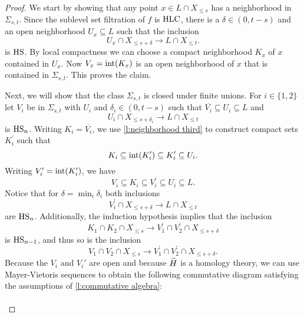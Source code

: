 \begin{proof}
	We start by showing that any point $x \in L \cap X_{\leq s}$ has a neighborhood in $\Sigma_{s, t}$.
	Since the sublevel set filtration of $f$ is $\mathrm{HLC}$, there is a $\delta \in (0, t-s)$ and an open neighborhood $U_x \subseteq L$ such that the inclusion
	\begin{equation*}
	U_x \cap X_{\leq s + \delta} \to
	L \cap X_{\leq t}.
	\end{equation*}
	is $\mathrm{HS}$.
	By local compactness we can choose a compact neighborhood $K_x$ of $x$ contained in $U_x$. Now $V_x = \operatorname{int} (K_x)$ is an open neighborhood of $x$ that is contained in $\Sigma_{s,t}$.
	This proves the claim.
	
	Next, we will show that the class $\Sigma_{s,t}$ is closed under finite unions.
	For $i \in \{1, 2\}$ let $V_i$ be in $\Sigma_{s,t}$ with $U_i$ and $\delta_i \in (0, t-s)$ 
    such that $\overline{V_i} \subseteq U_i \subseteq L$ and
	\[U_{i} \cap X_{\leq s+\delta_i} \to L \cap X_{\leq t}\]
	is $\mathrm{HS}_n$.
	Writing $K_i = \overline{V_i}$, we use \cref{l:neighborhood third} to construct compact sets $K_i^\prime$ such that
	\begin{equation*}
	K_i \subseteq \operatorname{int}(K_i^\prime) \subseteq K_i^\prime \subseteq U_i.
	\end{equation*}
	Writing $V_i^\prime = \operatorname{int}(K_i^\prime)$,
	we have 
	\begin{equation*}
	V_i \subseteq K_i \subseteq V_i^\prime 
    \subseteq U_i 
	\subseteq L.
	\end{equation*}
	Notice that for $\delta = \min_i\delta_i$ both inclusions
	\[V_i^\prime \cap X_{\leq s+\delta} \to L \cap X_{\leq t}\]
	are $\mathrm{HS}_n$.
	Additionally, the induction hypothesis implies that the inclusion
	\[
	K_1 \cap K_2 \cap X_{\leq s} \to V_1^\prime \cap V_2^\prime \cap X_{\leq s+\delta}
	\]
	is $\mathrm{HS}_{n-1}$, and thus so is the inclusion
	\[
	V_1 \cap V_2 \cap X_{\leq s} 
	\to V_1^\prime \cap V_2^\prime \cap X_{\leq s+\delta}.
	\]
    Because the $V_i$ and $V_i'$ are open and because $\widetilde{H}$ is a homology theory, we can use Mayer-Vietoris sequences to obtain the following commutative diagram satisfying the assumptions of \cref{l:commutative algebra}:
	\begin{equation*}
	\begin{tikzcd}[column sep=small]

\end{tikzcd}
\end{equation*}
\end{proof}
